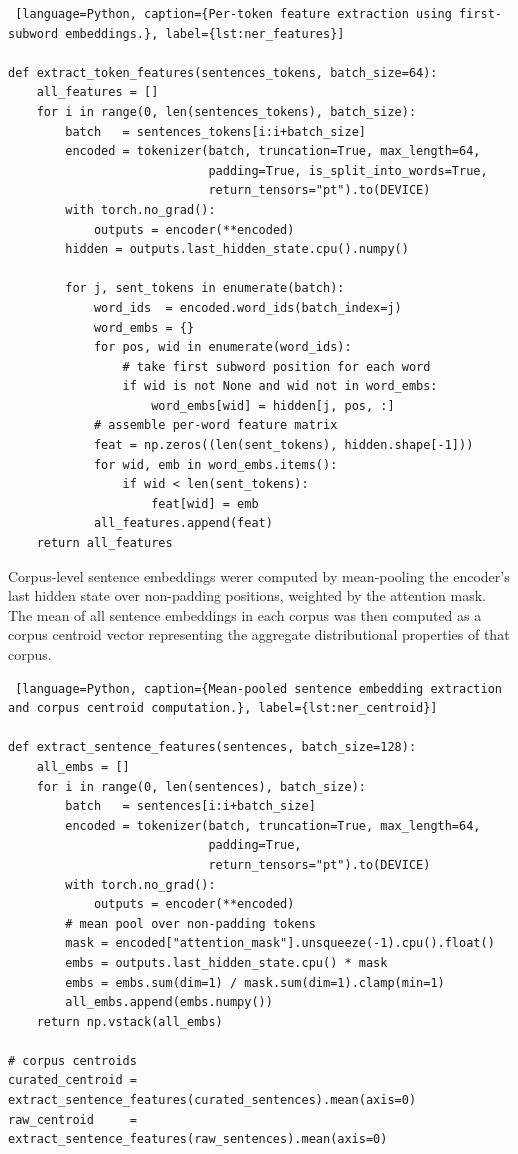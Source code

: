 \documentclass[11pt,a4paper]{article}
\begin{document}
\begin{lstlisting} [language=Python, caption={Per-token feature extraction using first-subword embeddings.}, label={lst:ner_features}]

def extract_token_features(sentences_tokens, batch_size=64):
    all_features = []
    for i in range(0, len(sentences_tokens), batch_size):
        batch   = sentences_tokens[i:i+batch_size]
        encoded = tokenizer(batch, truncation=True, max_length=64,
                            padding=True, is_split_into_words=True,
                            return_tensors="pt").to(DEVICE)
        with torch.no_grad():
            outputs = encoder(**encoded)
        hidden = outputs.last_hidden_state.cpu().numpy()
 
        for j, sent_tokens in enumerate(batch):
            word_ids  = encoded.word_ids(batch_index=j)
            word_embs = {}
            for pos, wid in enumerate(word_ids):
                # take first subword position for each word
                if wid is not None and wid not in word_embs:
                    word_embs[wid] = hidden[j, pos, :]
            # assemble per-word feature matrix
            feat = np.zeros((len(sent_tokens), hidden.shape[-1]))
            for wid, emb in word_embs.items():
                if wid < len(sent_tokens):
                    feat[wid] = emb
            all_features.append(feat)
    return all_features

\end{lstlisting}

Corpus-level sentence embeddings werer computed by mean-pooling the encoder's last hidden state over non-padding positions, weighted by the attention mask. The mean of all sentence embeddings in each corpus was then computed as a corpus centroid vector representing the aggregate distributional properties of that corpus.

\begin{lstlisting} [language=Python, caption={Mean-pooled sentence embedding extraction and corpus centroid computation.}, label={lst:ner_centroid}]

def extract_sentence_features(sentences, batch_size=128):
    all_embs = []
    for i in range(0, len(sentences), batch_size):
        batch   = sentences[i:i+batch_size]
        encoded = tokenizer(batch, truncation=True, max_length=64,
                            padding=True,
                            return_tensors="pt").to(DEVICE)
        with torch.no_grad():
            outputs = encoder(**encoded)
        # mean pool over non-padding tokens
        mask = encoded["attention_mask"].unsqueeze(-1).cpu().float()
        embs = outputs.last_hidden_state.cpu() * mask
        embs = embs.sum(dim=1) / mask.sum(dim=1).clamp(min=1)
        all_embs.append(embs.numpy())
    return np.vstack(all_embs)
 
# corpus centroids
curated_centroid = extract_sentence_features(curated_sentences).mean(axis=0)
raw_centroid     = extract_sentence_features(raw_sentences).mean(axis=0)

\end{lstlisting}
\end{document}
